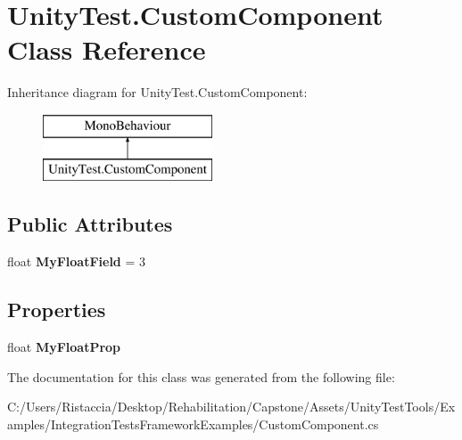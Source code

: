 \hypertarget{class_unity_test_1_1_custom_component}{}\section{Unity\+Test.\+Custom\+Component Class Reference}
\label{class_unity_test_1_1_custom_component}
Inheritance diagram for Unity\+Test.\+Custom\+Component\+:\begin{figure}[H]
\begin{center}
\leavevmode
\includegraphics[height=2.000000cm]{class_unity_test_1_1_custom_component}
\end{center}
\end{figure}
\subsection*{Public Attributes}
\begin{DoxyCompactItemize}
\item 
\mbox{\label{class_unity_test_1_1_custom_component_a413f157ddac8c8a417d4fdb20acba09b}} 
float {\bfseries My\+Float\+Field} = 3
\end{DoxyCompactItemize}
\subsection*{Properties}
\begin{DoxyCompactItemize}
\item 
\mbox{\label{class_unity_test_1_1_custom_component_a0dc41664fef8d4f1b8e89db9e8a3546c}} 
float {\bfseries My\+Float\+Prop}
\end{DoxyCompactItemize}


The documentation for this class was generated from the following file\+:\begin{DoxyCompactItemize}
\item 
C\+:/\+Users/\+Ristaccia/\+Desktop/\+Rehabilitation/\+Capstone/\+Assets/\+Unity\+Test\+Tools/\+Examples/\+Integration\+Tests\+Framework\+Examples/Custom\+Component.\+cs\end{DoxyCompactItemize}
